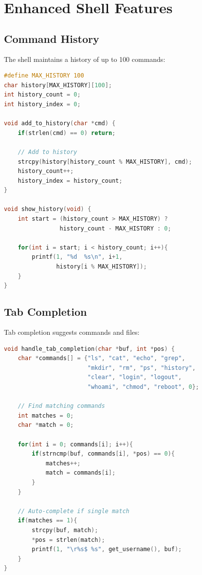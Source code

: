 \documentclass[a4paper,12pt]{report}
\begin{document}
\newpage

\chapter{Enhanced Shell Features}
\thispagestyle{contentpages}
\justifying

\section{Command History}

The shell maintains a history of up to 100 commands:

\begin{lstlisting}[language=C, caption=Command History Implementation (sh.c)]
#define MAX_HISTORY 100
char history[MAX_HISTORY][100];
int history_count = 0;
int history_index = 0;

void add_to_history(char *cmd) {
    if(strlen(cmd) == 0) return;
    
    // Add to history
    strcpy(history[history_count % MAX_HISTORY], cmd);
    history_count++;
    history_index = history_count;
}

void show_history(void) {
    int start = (history_count > MAX_HISTORY) ? 
                history_count - MAX_HISTORY : 0;
    
    for(int i = start; i < history_count; i++){
        printf(1, "%d  %s\n", i+1, 
               history[i % MAX_HISTORY]);
    }
}
\end{lstlisting}

\section{Tab Completion}

Tab completion suggests commands and files:

\begin{lstlisting}[language=C, caption=Tab Completion (sh.c)]
void handle_tab_completion(char *buf, int *pos) {
    char *commands[] = {"ls", "cat", "echo", "grep", 
                        "mkdir", "rm", "ps", "history", 
                        "clear", "login", "logout", 
                        "whoami", "chmod", "reboot", 0};
    
    // Find matching commands
    int matches = 0;
    char *match = 0;
    
    for(int i = 0; commands[i]; i++){
        if(strncmp(buf, commands[i], *pos) == 0){
            matches++;
            match = commands[i];
        }
    }
    
    // Auto-complete if single match
    if(matches == 1){
        strcpy(buf, match);
        *pos = strlen(match);
        printf(1, "\r%s$ %s", get_username(), buf);
    }
}
\end{lstlisting}
\end{document}
